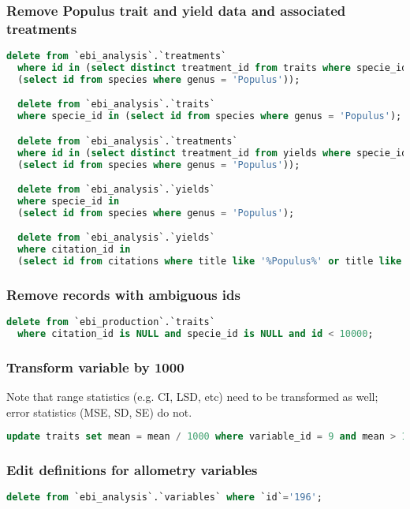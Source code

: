 \begin{enumerate}
\subsubsection{Remove Populus trait and yield data and associated treatments}
\begin{lstlisting}[language=SQL]
  delete from `ebi_analysis`.`treatments` 
  where id in (select distinct treatment_id from traits where specie_id in 
  (select id from species where genus = 'Populus'));

  delete from `ebi_analysis`.`traits` 
  where specie_id in (select id from species where genus = 'Populus');

  delete from `ebi_analysis`.`treatments` 
  where id in (select distinct treatment_id from yields where specie_id in 
  (select id from species where genus = 'Populus'));

  delete from `ebi_analysis`.`yields` 
  where specie_id in 
  (select id from species where genus = 'Populus');

  delete from `ebi_analysis`.`yields` 
  where citation_id in 
  (select id from citations where title like '%Populus%' or title like '%poplar%' or title like '%aspen%');
\end{lstlisting}

\subsubsection{Remove records with ambiguous ids}
\begin{lstlisting}[language=SQL]
  delete from `ebi_production`.`traits` 
  where citation_id is NULL and specie_id is NULL and id < 10000;
\end{lstlisting}

\subsubsection{Transform variable by 1000}
Note that range statistics (e.g. CI, LSD, etc) need to be transformed as well; error statistics (MSE, SD, SE) do not.  
\begin{lstlisting}[language=SQL]
  update traits set mean = mean / 1000 where variable_id = 9 and mean > 1;
\end{lstlisting}


\subsubsection{Edit definitions for allometry variables}
\begin{lstlisting}[language=SQL]
  delete from `ebi_analysis`.`variables` where `id`='196';


\end{lstlisting}
\end{enumerate}
